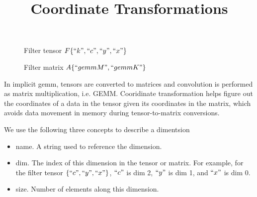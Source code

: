 



\title{Coordinate Transformations}

\maketitle

{}
\begin{figure}[!h]
  \centering
  \caption{Filter tensor $F\{``k",``c",``y",``x"\}$}
  \label{fig:filter_tensor}
\end{figure}

{}
\begin{figure}[!h]
  \centering
  \caption{Filter matrix $A\{``gemmM",``gemmK"\}$}
  \label{fig:filter_matrix_A}
\end{figure}

In implicit gemm, tensors are converted to matrices and convolution
is performed as matrix multiplication, i.e. GEMM.
Cooridinate transformation helps figure out the coordinates of a data in the
tensor given its coordinates in the matrix, which avoids data movement in memory
during tensor-to-matrix conversions.

We use the following three concepts to describe a dimentsion
\begin{itemize}
\item name. A string used to reference the dimension.
\item dim. The index of this dimension in the tensor or matrix.
  For example, for the filter tensor $\{``c",``y",``x"\}$,
  $``c"$ is dim 2, $``y"$ is dim 1, and $``x"$ is dim 0.
\item size. Number of elements along this dimension.
\end{itemize}

